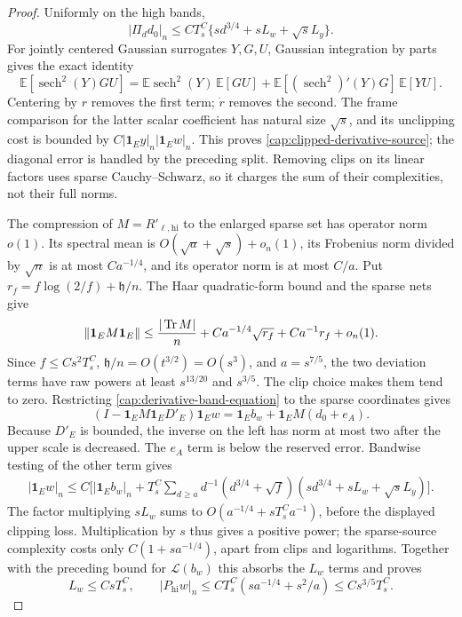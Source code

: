 \begin{proof}
Uniformly on the high bands,
\begin{equation}\label{cap:clipped-derivative-source}
 |\Pi_dd_0|_n\le CT_s^C
        \{sd^{3/4}+sL_w+\sqrt sL_y\}.
\end{equation}
For jointly centered Gaussian surrogates $Y,G,U$, Gaussian integration
by parts gives the exact identity
\[
 \mathbb E[\operatorname{sech}^2(Y)GU]
 =\mathbb E\operatorname{sech}^2(Y)\,\mathbb E[GU]
   +\mathbb E[(\operatorname{sech}^2)'(Y)G]\,\mathbb E[YU].
\]
Centering by $r$ removes the first term; $\dot r$ removes the second. The
frame comparison for the latter scalar coefficient has natural size $\sqrt s$,
and its unclipping cost is bounded by $C|\mathbf1_Ey|_n|\mathbf1_Ew|_n$. This
proves \eqref{cap:clipped-derivative-source}; the diagonal error is handled by
the preceding split. Removing clips on its linear factors uses sparse
Cauchy--Schwarz, so it charges the sum of their complexities, not their full
norms.

The compression of \(M=R'_{\ell,\mathrm{hi}}\) to the enlarged sparse set
has operator norm \(o(1)\). Its spectral mean is \(O(\sqrt a+\sqrt s)+o_n(1)\), its
Frobenius norm divided by $\sqrt n$ is at most $Ca^{-1/4}$, and its operator
norm is at most \(C/a\). Put
\(r_f=f\log(2/f)+\mathfrak h/n\). The Haar quadratic-form bound and the
sparse nets give
\[
 \|\mathbf1_E M\mathbf1_E\|
 \le \frac{|\operatorname{Tr} M|}{n}
      +C a^{-1/4}\sqrt{r_f}+C a^{-1}r_f+o_n(1).
\]
Since \(f\le Cs^2T_s^C\), \(\mathfrak h/n=O(t^{3/2})=O(s^3)\), and
\(a=s^{7/5}\), the two deviation terms have raw powers at least
\(s^{13/20}\) and \(s^{3/5}\). The clip choice makes them tend to zero.
Restricting \eqref{cap:derivative-band-equation} to the sparse coordinates
gives
\[
 (I-\mathbf1_E M\mathbf1_E D'_E)\mathbf1_Ew
 =\mathbf1_Eb_w+\mathbf1_E M(d_0+e_A).
\]
Because \(D'_E\) is bounded, the inverse on the left has norm at most two
after the upper scale is decreased. The \(e_A\) term is below the reserved
error. Bandwise testing of the other term gives
\begin{equation}\label{cap:derivative-tail-energy}
 \begin{split}
 |\mathbf1_Ew|_n\le C\bigg[|\mathbf1_Eb_w|_n+
 T_s^C\sum_{d\ge a}d^{-1}(d^{3/4}+\sqrt f)
             (sd^{3/4}+sL_w+\sqrt sL_y)\bigg].
 \end{split}
\end{equation}
The factor multiplying $sL_w$ sums to $O(a^{-1/4}+sT_s^Ca^{-1})$, before the
displayed clipping loss. Multiplication by $s$ thus gives a positive power;
the sparse-source complexity costs only $C(1+sa^{-1/4})$, apart from clips and
logarithms. Together with the preceding bound for $\mathscr L(b_w)$ this
absorbs the $L_w$ terms and proves
\begin{equation}\label{cap:first-derivative-localization}
 L_w\le CsT_s^C,\qquad
 |P_{\mathrm{hi}}w|_n
 \le CT_s^C(sa^{-1/4}+s^2/a)
 \le Cs^{3/5}T_s^C.
\end{equation}


\end{proof}
